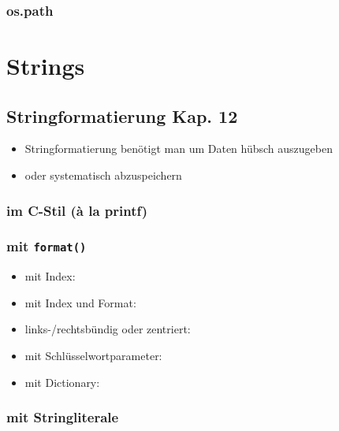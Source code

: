 \subsubsection{os.path}


\section{Strings}

\subsection[Stringformatierung]{Stringformatierung \tiny{Kap. 12}}
\begin{itemize}
	\item Stringformatierung benötigt man um Daten hübsch auszugeben
	
	\item oder systematisch abzuspeichern
	
\end{itemize}

\subsubsection{im C-Stil (à la printf)}


\subsubsection{mit \texttt{format()}}
\begin{itemize}
	
	\item mit Index:
	
	\item mit Index und Format:
	
	\item links-/rechtsbündig oder zentriert:
	
	\item mit Schlüsselwortparameter:
	
	\item mit Dictionary:
	
\end{itemize}

\subsubsection{mit Stringliterale}



